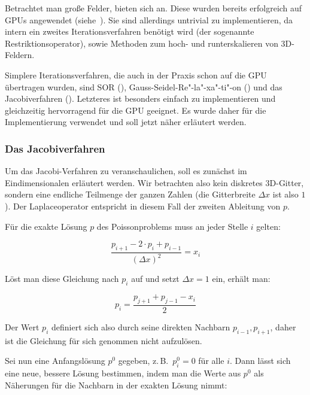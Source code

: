Betrachtet man große Felder, bieten sich
 an. Diese wurden bereits
erfolgreich auf GPUs angewendet (siehe~\cite{Bolz2002,
Matthias2006}). Sie sind allerdings untrivial zu implementieren, da
intern ein zweites Iterationsverfahren benötigt wird (der sogenannte
Restriktionsoperator), sowie Methoden zum hoch- und runterskalieren
von 3D-Feldern.

Simplere Iterationsverfahren, die auch in der Praxis schon auf die GPU
übertragen wurden, sind SOR (\cite{Saltvik2006}),
Gauss-Seidel-Re"-la"-xa"-ti"-on (\cite{Stam2003}) und das
Jacobiverfahren (\cite{Crane2007, Harris2008, Peschel2009}). Letzteres ist besonders einfach zu implementieren
und gleichzeitig hervorragend für die GPU geeignet. Es wurde daher für
die Implementierung verwendet und soll jetzt näher erläutert werden.

\subsubsection{Das Jacobiverfahren}

Um das Jacobi-Verfahren zu veranschaulichen, soll es zunächst im
Eindimensionalen erläutert werden. Wir betrachten also kein diskretes 3D-Gitter,
sondern eine endliche Teilmenge der ganzen Zahlen (die Gitterbreite $\Delta x$
ist also $1$). Der Laplaceoperator entspricht in diesem Fall der zweiten
Ableitung von $p$.

Für die exakte Lösung $p$ des Poissonproblems muss an jeder Stelle $i$ gelten:

\begin{equation}
\label{eq:stam_jacobi_onedimensional}
\frac{
	p_{i+1} -
	2 \cdot p_{i} +
	p_{i-1}
}
{
	{(\Delta x)}^2
}
=
x_i
\end{equation}

Löst man diese Gleichung nach $p_i$ auf und setzt $\Delta x = 1$ ein, erhält
man:

\begin{equation}
p_i
=
\frac{
	p_{j+1} +
	p_{j-1} -
	x_i
}
{
	2
}
\end{equation}

Der Wert $p_i$ definiert sich also durch seine direkten Nachbarn $p_{i-1},
p_{i+1}$, daher ist die Gleichung für sich genommen nicht aufzulösen.

Sei nun eine Anfangslösung $p^0$ gegeben, z.\,B.\ $p^0_i = 0$ für alle $i$.
Dann lässt sich eine neue, bessere Lösung bestimmen, indem man die Werte aus
$p^0$ als Näherungen für die Nachbarn in der exakten Lösung nimmt:

